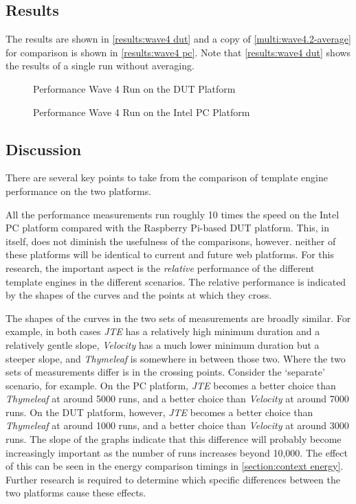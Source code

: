 \subsection{Results}
The results are shown in \autoref{results:wave4 dut} and a copy of \autoref{multi:wave4.2-average} for comparison is shown in \autoref{results:wave4 pc}. Note that \autoref{results:wave4 dut} shows the results of a single run without averaging.

\begin{figure}[ht!]
\centering

\caption{\label{results:wave4 dut}Performance Wave 4 Run on the DUT Platform}
\end{figure}

\begin{figure}[ht!]
\centering

\caption{\label{results:wave4 pc}Performance Wave 4 Run on the Intel PC Platform}
\end{figure}

\subsection{Discussion}

There are several key points to take from the comparison of template engine performance on the two platforms.

All the performance measurements run roughly 10 times the speed on the Intel PC platform compared with the Raspberry Pi-based DUT platform. This, in itself, does not diminish the usefulness of the comparisons, however. neither of these platforms will be identical to current and future web platforms. For this research, the important aspect is the \emph{relative} performance of the different template engines in the different scenarios. The relative performance is indicated by the shapes of the curves and the points at which they cross.

The shapes of the curves in the two sets of measurements are broadly similar. For example, in both cases \emph{JTE} has a relatively high minimum duration and a relatively gentle slope, \emph{Velocity} has a much lower minimum duration but a steeper slope, and \emph{Thymeleaf} is somewhere in between those two. Where the two sets of measurements differ is in the crossing points. Consider the `separate' scenario, for example. On the PC platform, \emph{JTE} becomes a better choice than \emph{Thymeleaf} at around 5000 runs, and a better choice than \emph{Velocity} at around 7000 runs. On the DUT platform, however, \emph{JTE} becomes a better choice than \emph{Thymeleaf} at around 1000 runs, and a better choice than \emph{Velocity} at around 3000 runs. The slope of the graphs indicate that this difference will probably become increasingly important as the number of runs increases beyond 10,000. The effect of this can be seen in the energy comparison timings in \autoref{section:context energy}.  Further research is required to determine which specific differences between the two platforms cause these effects.

